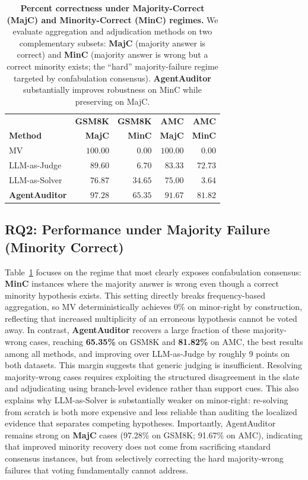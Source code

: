 \documentclass{article}
\theoremstyle{plain}
\theoremstyle{definition}
\theoremstyle{remark}
\begin{document}
\begin{table}[t]
\centering
\small
\setlength{\tabcolsep}{5pt}
\renewcommand{\arraystretch}{0.9}
\caption{\textbf{Percent correctness under Majority-Correct (MajC) and Minority-Correct (MinC) regimes.}
We evaluate aggregation and adjudication methods on two complementary subsets: \textbf{MajC} (majority answer is correct) and \textbf{MinC} (majority answer is wrong but a correct minority exists; the ``hard'' majority-failure regime targeted by confabulation consensus). \textbf{AgentAuditor} substantially improves robustness on MinC while preserving on MajC.}
\label{tab:rq2_major_minor}
\begin{tabular}{lrrrr}
& \textbf{GSM8K} & \textbf{GSM8K} & \textbf{AMC} & \textbf{AMC} \\
\textbf{Method} & \textbf{MajC} & \textbf{MinC} & \textbf{MajC} & \textbf{MinC} \\
\toprule
MV              & $100.00$ & $0.00$ & $100.00$ & $0.00$ \\
LLM-as-Judge    & $89.60$  & $6.70$ & $83.33$  & $72.73$ \\
LLM-as-Solver   & $76.87$  & $34.65$ & $75.00$  & $3.64$ \\
\cellcolor{graybg}\textbf{AgentAuditor} & \cellcolor{graybg}$\pmb{97.28}$ & \cellcolor{graybg}$\pmb{65.35}$ & \cellcolor{graybg}$\pmb{91.67}$ & \cellcolor{graybg}$\pmb{81.82}$ \\
\bottomrule
\end{tabular}
\end{table}


\subsection{RQ2: Performance under Majority Failure (Minority Correct)}
\label{sec:rq2}

Table~\ref{tab:rq2_major_minor} focuses on the regime that most clearly exposes confabulation consensus: \textbf{MinC} instances where the majority answer is wrong even though a correct minority hypothesis exists. This setting directly breaks frequency-based aggregation, so MV deterministically achieves $0\%$ on minor-right by construction, reflecting that increased multiplicity of an erroneous hypothesis cannot be voted away. In contrast, \textbf{AgentAuditor} recovers a large fraction of these majority-wrong cases, reaching \textbf{65.35\%} on GSM8K and \textbf{81.82\%} on AMC, the best results among all methods, and improving over LLM-as-Judge by roughly 9 points on both datasets. This margin suggests that generic judging is insufficient. Resolving majority-wrong cases requires exploiting the structured disagreement in the slate and adjudicating using branch-level evidence rather than support cues. This also explains why LLM-as-Solver is substantially weaker on minor-right: re-solving from scratch is both more expensive and less reliable than auditing the localized evidence that separates competing hypotheses. Importantly, AgentAuditor remains strong on \textbf{MajC} cases (97.28\% on GSM8K; 91.67\% on AMC), indicating that improved minority recovery does not come from sacrificing standard consensus instances, but from selectively correcting the hard majority-wrong failures that voting fundamentally cannot address.
\end{document}
